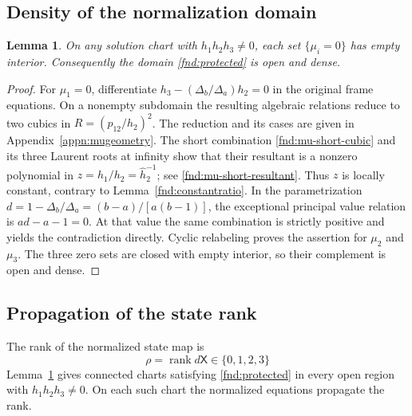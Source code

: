 \documentclass[11pt,a4paper]{article}
\numberwithin{equation}{section}
\theoremstyle{plain}
\newtheorem{lemma}[theorem]{Lemma}
\theoremstyle{definition}
\theoremstyle{remark}
\begin{document}
\subsection{Density of the normalization domain}\label{fnd:muwallsubsection}
\begin{lemma}\label{fnd:muwall}
On any solution chart with $h_1h_2h_3\ne0$, each set $\{\mu_i=0\}$ has empty interior. Consequently the domain \eqref{fnd:protected} is open and dense.
\end{lemma}
\begin{proof}
For $\mu_1=0$, differentiate $h_3-(\Delta_b/\Delta_a)h_2=0$ in the original
frame equations. On a nonempty subdomain the resulting algebraic
relations reduce to two cubics in $R=(p_{12}/h_2)^2$.
The reduction and its cases are given in Appendix~\ref{appn:mugeometry}.
The short combination \eqref{fnd:mu-short-cubic} and its three
Laurent roots at infinity show that their resultant is a nonzero
polynomial in $z=h_1/h_2=\widehat h_2^{-1}$; see \eqref{fnd:mu-short-resultant}.
Thus $z$ is locally constant, contrary to
Lemma~\ref{fnd:constantratio}. In the parametrization
$d=1-\Delta_b/\Delta_a=(b-a)/[a(b-1)]$, the exceptional principal value relation is
$ad-a-1=0$. At that value the same combination is strictly positive and yields
the contradiction directly. Cyclic relabeling proves the assertion
for $\mu_2$ and $\mu_3$. The three zero sets are closed with empty
interior, so their complement is open and dense.
\end{proof}

\subsection{Propagation of the state rank}
The rank of the normalized state map is
\begin{equation}\label{intro:rankmeaning}
 \rho=\operatorname{rank}d\mathsf X\in\{0,1,2,3\}
\end{equation}
Lemma~\ref{fnd:muwall} gives connected charts satisfying
\eqref{fnd:protected} in every open region with $h_1h_2h_3\ne0$. On each
such chart the normalized equations propagate the rank.
\end{document}
